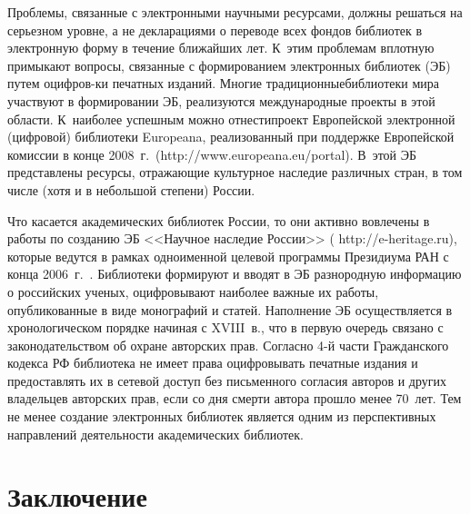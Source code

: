 \begin{multicols}{2}
Проблемы, связанные с 
электронными научными ресурсами, должны решаться на серьезном уровне, а не 
декларациями о переводе всех фондов библиотек в электронную форму в течение 
ближайших лет. К~этим проблемам вплотную примыкают вопросы, связанные с 
формированием электронных библиотек (ЭБ) путем оцифров-\linebreak ки печатных изданий. 
Многие традиционные\linebreak биб\-лио\-те\-ки мира участвуют в формировании ЭБ, реализуются 
международные проекты в этой об\-ласти. К~наиболее успешным можно \mbox{отнести}\linebreak проект 
Европейской электронной (циф\-ро\-вой) биб\-лио\-те\-ки {Europeana}, реализованный при 
поддержке Европейской комиссии в конце 2008~г.\ ({\sf http://www.europeana.eu/portal}). 
В~этой ЭБ представлены ресурсы, отражающие культурное наследие различных стран, в 
том числе (хотя и в небольшой степени) России.
   
   Что касается академических библиотек России, то они активно вовлечены в работы по 
созданию ЭБ <<Научное наследие России>> ({\sf 
   http://e-heritage.ru}), которые ведутся в рамках одноименной целевой программы 
Президиума РАН с конца 2006~г.~\cite{15kale, 16kale}. Библиотеки формируют и вводят в 
ЭБ разнородную информацию о российских ученых, оцифровывают наиболее важные их 
работы, опубликованные в виде монографий и статей. Наполнение ЭБ осуществляется в 
хронологическом порядке начиная с XVIII~в., что в первую очередь связано с 
законодательством об охране авторских прав. Согласно 4-й части Граж\-дан\-ско\-го кодекса 
РФ библиотека не имеет права оцифровывать печатные издания и предоставлять их в 
сетевой доступ без письменного согласия авторов и других владельцев авторских прав, 
если со дня смерти автора прошло менее 70~лет. Тем не менее создание электронных 
библиотек является одним из перспективных направлений деятельности академических 
библиотек.

\section{Заключение }
   

\end{multicols}
